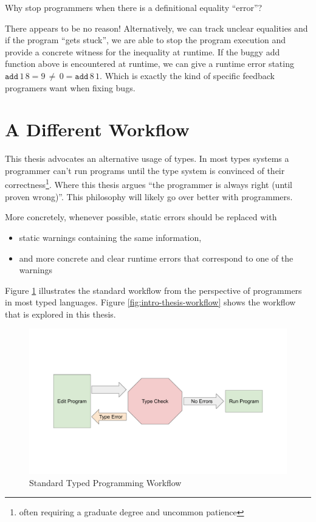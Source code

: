Why stop programmers when there is a definitional equality ``error''? 

There appears to be no reason! Alternatively, we can track unclear equalities and if the program ``gets stuck'', we are able to stop the program execution and provide a concrete witness for the inequality at runtime.
If the buggy add function above is encountered at runtime, we can give a runtime error stating $\mathtt{add}\,1\,8=9\,\neq\,0=\mathtt{add}\,8\,1$.
Which is exactly the kind of specific feedback programers want when fixing bugs.

\section{A Different Workflow}

This thesis advocates an alternative usage of types. In most types systems a programmer can't run programs until the type system is convinced of their correctness\footnote{
 often requiring a graduate degree and uncommon patience}.
Where this thesis argues ``the programmer is always right (until proven wrong)''.
This philosophy will likely go over better with programmers.

More concretely, whenever possible, static errors should be replaced with
\begin{itemize}
\item static warnings containing the same information,
\item and more concrete and clear runtime errors that correspond to one of the warnings
\end{itemize}
Figure \ref{fig:intro-standard-workflow} illustrates the standard workflow from the perspective of programmers in most typed languages.
Figure \ref{fig:intro-thesis-workflow} shows the workflow that is explored in this thesis.

\begin{figure}

\includegraphics[width=5in]{1_intro/fig/standard-workflow.pdf}

\caption{Standard Typed Programming Workflow}
\label{fig:intro-standard-workflow}
\end{figure}

